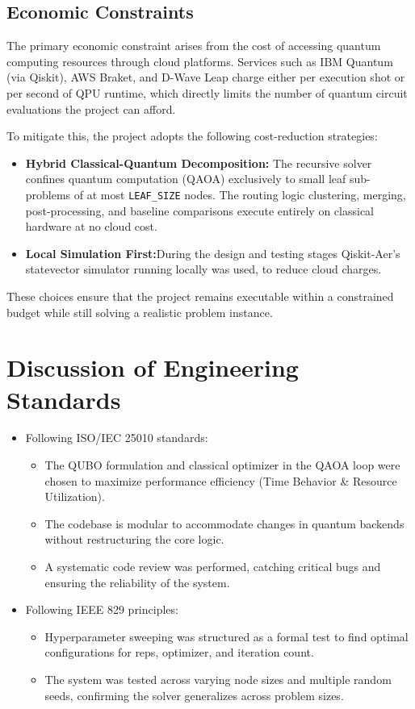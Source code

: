 \documentclass[a4paper]{report}
\begin{document}
{\begin{itemize}
\subsection{Economic Constraints}

The primary economic constraint arises from the cost of accessing quantum 
computing resources through cloud platforms. Services such as IBM Quantum (via 
Qiskit), AWS Braket, and D-Wave Leap charge either per execution shot or per second of QPU runtime, which directly limits the number of quantum circuit evaluations the project can afford.

To mitigate this, the project adopts the following cost-reduction strategies:

\begin{itemize}

    \item \textbf{Hybrid Classical-Quantum Decomposition:} The recursive solver 
    confines quantum computation (QAOA) exclusively to small leaf sub-problems of 
    at most \texttt{LEAF\_SIZE} nodes. The routing logic clustering, merging, post-processing, and baseline comparisons execute entirely on classical hardware at no cloud cost.

    \item \textbf{Local Simulation First:}During the design and testing stages Qiskit-Aer’s statevector simulator running locally was used, to reduce cloud charges.
 
\end{itemize}
These choices ensure that the project remains executable within a constrained budget while still solving a realistic problem instance.


\section{Discussion of Engineering Standards }
\begin{itemize}
    \item Following ISO/IEC 25010 standards:
    \begin{itemize}
        \item The QUBO formulation and classical optimizer in the QAOA loop were chosen to maximize performance efficiency (Time Behavior \& Resource Utilization).
        \item The codebase is modular to accommodate changes in quantum backends without restructuring the core logic.
        \item A systematic code review was performed, catching critical bugs and ensuring the reliability of the system.
    \end{itemize}
    \item Following IEEE 829 principles:
    \begin{itemize}
        \item Hyperparameter sweeping was structured as a formal test to find optimal configurations for reps, optimizer, and iteration count.
        \item The system was tested across varying node sizes and multiple random seeds, confirming the solver generalizes across problem sizes.
    \end{itemize}
\end{itemize}

\end{itemize}}
\end{document}
